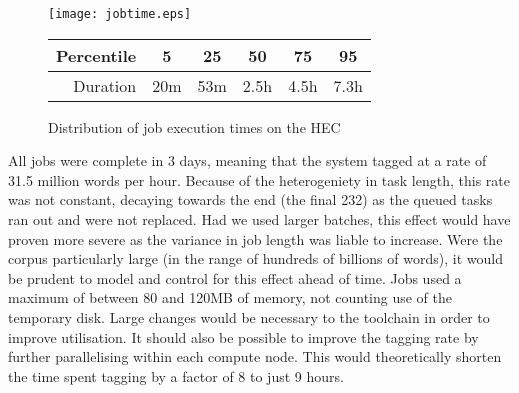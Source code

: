 % 
% 
% 
% 
% 

\begin{figure}[h]
    \centering
    \texttt{[image: jobtime.eps]}

    \begin{tabular}{ | r | c | c | c | c | c | }
        \hline
        Percentile & 5 & 25 & 50 & 75 & 95 \\ \hline
        Duration & 20m & 53m & 2.5h & 4.5h & 7.3h \\ \hline
    \end{tabular}

    \caption{Distribution of job execution times on the HEC}
    \label{fig:jobtimes}
\end{figure}


% 
% 
% 
% 




All jobs were complete in 3 days, meaning that the system tagged at a rate of 31.5 million words 
per hour.  Because of the heterogeniety in task length, this rate was not constant, decaying towards the end (the final 232) as the queued tasks ran out and were not replaced.  Had we used larger batches, this effect would have proven more severe as the variance in job length was liable to increase.  Were the corpus particularly large (in the range of hundreds of billions of words), it would be prudent to model and control for this effect ahead of time.
Jobs used a maximum of between 80 and 120MB of memory, not counting use of the temporary disk.  Large changes would be necessary to the toolchain in order to improve utilisation.  It should also be possible to improve the tagging rate by further parallelising within each compute node.  This would theoretically shorten the time spent tagging by a factor of 8 to just 9 hours.

